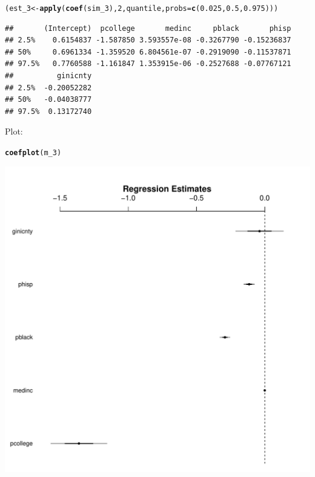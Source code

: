 \documentclass{article}\usepackage[]{graphicx}\usepackage[]{color}
\makeatletter
\def\maxwidth{ %
  \ifdim\Gin@nat@width>\linewidth
    \linewidth
  \else
    \Gin@nat@width
  \fi
}
\newcommand{\hlnum}[1]{\textcolor[rgb]{0.686,0.059,0.569}{#1}}%
\newcommand{\hlstd}[1]{\textcolor[rgb]{0.345,0.345,0.345}{#1}}%
\newcommand{\hlkwb}[1]{\textcolor[rgb]{0.69,0.353,0.396}{#1}}%
\newcommand{\hlkwc}[1]{\textcolor[rgb]{0.333,0.667,0.333}{#1}}%
\newcommand{\hlkwd}[1]{\textcolor[rgb]{0.737,0.353,0.396}{\textbf{#1}}}%
\newenvironment{kframe}{%
 \def\at@end@of@kframe{}%
 \ifinner\ifhmode%
  \def\at@end@of@kframe{\end{minipage}}%
  \begin{minipage}{\columnwidth}%
 \fi\fi%
 \def\FrameCommand##1{\hskip\@totalleftmargin \hskip-\fboxsep
 \colorbox{shadecolor}{##1}\hskip-\fboxsep
     \hskip-\linewidth \hskip-\@totalleftmargin \hskip\columnwidth}%
 \MakeFramed {\advance\hsize-\width
   \@totalleftmargin\z@ \linewidth\hsize
   \@setminipage}}%
 {\par\unskip\endMakeFramed%
 \at@end@of@kframe}
\newenvironment{knitrout}{}{} %
\makeatother
\begin{document}
\begin{knitrout}
\color{fgcolor}\begin{kframe}
\begin{alltt}
\hlstd{(est_3} \hlkwb{<-} \hlkwd{apply}\hlstd{(}\hlkwd{coef}\hlstd{(sim_3),} \hlnum{2}\hlstd{, quantile,} \hlkwc{probs} \hlstd{=} \hlkwd{c}\hlstd{(}\hlnum{0.025}\hlstd{,} \hlnum{0.5}\hlstd{,} \hlnum{0.975}\hlstd{)))}
\end{alltt}
\begin{verbatim}
##       (Intercept)  pcollege       medinc     pblack       phisp
## 2.5%    0.6154837 -1.587850 3.593557e-08 -0.3267790 -0.15236837
## 50%     0.6961334 -1.359520 6.804561e-07 -0.2919090 -0.11537871
## 97.5%   0.7760588 -1.161847 1.353915e-06 -0.2527688 -0.07767121
##          ginicnty
## 2.5%  -0.20052282
## 50%   -0.04038777
## 97.5%  0.13172740
\end{verbatim}
\end{kframe}
\end{knitrout}

Plot:

\begin{knitrout}
\color{fgcolor}\begin{kframe}
\begin{alltt}
\hlkwd{coefplot}\hlstd{(m_3)}
\end{alltt}
\end{kframe}
\includegraphics[width=\maxwidth]{figure/unnamed-chunk-9-1} 

\end{knitrout}
\end{document}
